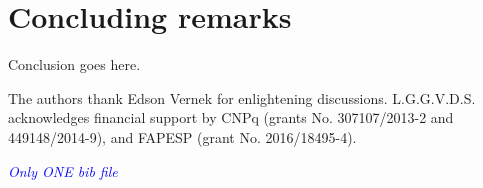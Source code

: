\documentclass[showpacs,aps,prb,reprint,superscriptaddress]{revtex4-1}
\newcommand{\LUIS}[1]{\textcolor{blue}{\fbox{Luis} {\sl#1}}}
\begin{document}






    
\section{Concluding remarks}
\label{sec:Conclusions}

Conclusion goes here.

\begin{acknowledgments}
The authors thank Edson Vernek for enlightening discussions.  L.G.G.V.D.S. acknowledges financial support by CNPq (grants No. 307107/2013-2 and 449148/2014-9), and FAPESP (grant No. 2016/18495-4).
\end{acknowledgments}

\LUIS{Only ONE bib file}




%


 \appendix
 
\end{document}
